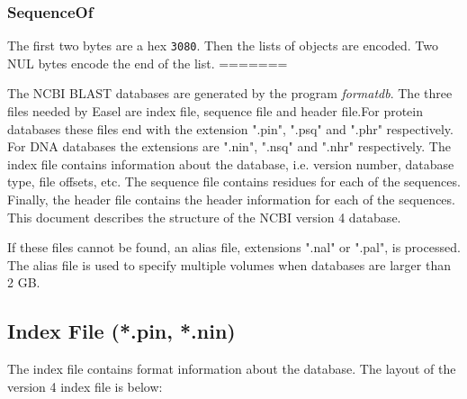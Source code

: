 \subsubsection{SequenceOf}

The first two bytes are a hex \verb+3080+.  Then the lists of objects are 
encoded.  Two NUL bytes encode the end of the list.
=======

The NCBI BLAST databases are generated by the program \emph{formatdb}.
The three files needed by Easel are index file, sequence file 
and header file.For protein databases these files end with the extension 
".pin", ".psq" and ".phr" respectively.  For DNA databases the 
extensions are ".nin", ".nsq" and ".nhr" respectively.  The index 
file contains information about the database, i.e. version number, 
database type, file offsets, etc.  The sequence file contains residues
for each of the sequences.  Finally, the header file contains the header 
information for each of the sequences.  This document describes the
structure of the NCBI version 4 database.

If these files cannot be found, an alias file, extensions ".nal" or
 ".pal", is processed.  The alias file is used to specify multiple
volumes when databases are larger than 2 GB.


\subsection{Index File (*.pin, *.nin)}

The index file contains format information about the database.   The 
layout of the version 4 index file is below:

